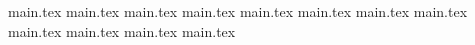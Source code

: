 \documentclass[11pt,a4paper,oneside]{article}
\begin{document}
    \pagebreak
    
    {main.tex} \pagebreak
    {main.tex} \pagebreak
    {main.tex} \pagebreak
    {main.tex} \pagebreak
    {main.tex} \pagebreak
    {main.tex} \pagebreak
    {main.tex} \pagebreak
    {main.tex} \pagebreak
    {main.tex} \pagebreak
    {main.tex} \pagebreak
    {main.tex} \pagebreak
    {main.tex} \pagebreak



        
        
        
    
    
\end{document}

